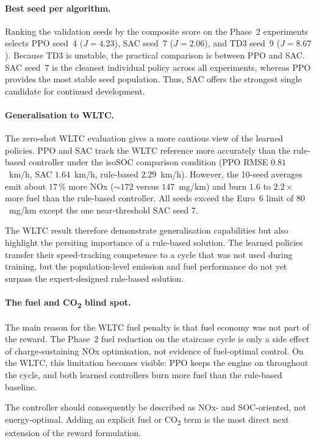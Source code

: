 \paragraph{Best seed per algorithm.}
Ranking the validation seeds by the composite score on the Phase~2 experiments selects PPO seed~4 ($J = 4.23$), SAC seed~7 ($J = 2.06$), and TD3 seed~9 ($J = 8.67$). Because TD3 is unstable, the practical comparison is between PPO and SAC. SAC seed~7 is the cleanest individual policy across all experiments, whereas PPO provides the most stable seed population. Thus, SAC offers the strongest single candidate for continued development.

\paragraph{Generalisation to WLTC.}
The zero-shot WLTC evaluation gives a more cautious view of the learned policies. PPO and SAC track the WLTC reference more accurately than the rule-based controller under the isoSOC comparison condition (PPO \ac{RMSE} $0.81$~km/h, SAC $1.64$~km/h, rule-based $2.29$~km/h). However, the 10-seed averages emit about $17\,\%$ more \ac{NOx} ($\sim 172$ versus $147$~mg/km) and burn $1.6$ to $2.2\times$ more fuel than the rule-based controller. All seeds exceed the Euro~6 limit of $80$~mg/km except the one near-threshold SAC seed 7.

The WLTC result therefore demonstrate generalisation capabilities but also highlight the persiting importance of a rule-based solution. The learned policies transfer their speed-tracking competence to a cycle that was not used during training, but the population-level emission and fuel performance do not yet surpass the expert-designed rule-based solution.

\paragraph{The fuel and CO\textsubscript{2} blind spot.}
The main reason for the WLTC fuel penalty is that fuel economy was not part of the reward. The Phase~2 fuel reduction on the staircase cycle is only a side effect of charge-sustaining \ac{NOx} optimisation, not evidence of fuel-optimal control. On the WLTC, this limitation becomes visible: PPO keeps the engine on throughout the cycle, and both learned controllers burn more fuel than the rule-based baseline.

The controller should consequently be described as \ac{NOx}- and \ac{SOC}-oriented, not energy-optimal. Adding an explicit fuel or CO\textsubscript{2} term is the most direct next extension of the reward formulation.

